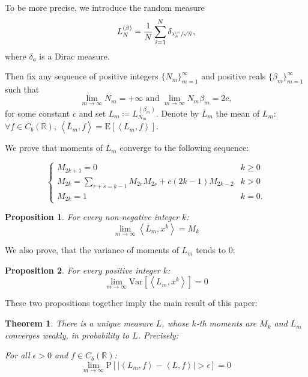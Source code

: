 \documentclass{article}
\newtheorem{theorem}{Theorem}
\newtheorem{proposition}{Proposition}
\newcommand{\apply}[2]{\left\langle#1, #2\right\rangle}
\newcommand{\prob}[1]{\mathrm{P}{\left[#1\right]}}
\newcommand{\Var}{\mathrm{Var}}
\newcommand{\E}{\mathrm{E}}
\begin{document}
    To be more precise, we introduce the random measure
    $$
        L_{N}^{(\beta)} = \frac{1}{N}\sum\limits_{i = 1}^{N}\delta_{\sfrac{\lambda_{N}^{(\beta)}}{\sqrt{N}}},
    $$
    where $\delta_{a}$ is a Dirac measure.

    
    Then fix any sequence of positive integers $\{N_m\}_{m = 1}^{\infty}$ and positive reals $\{\beta_{m}\}_{m = 1}^{\infty}$ such that
    $$
        \lim\limits_{m \to \infty}N_m = +\infty \text{ and } \lim\limits_{m \to \infty}N_m\beta_m = 2c,
    $$
    for some constant $c$ and set $L_m \coloneqq L_{N_m}^{(\beta_m)}$. Denote by $\overline{L}_m$ the mean of $L_m$: $\forall f \in C_{b}(\mathbb{R}), \, \apply{\overline{L}_m}{f} = \E\left[\apply{L_m}{f}\right]$.
    
    We prove that moments of $\overline{L}_m$ converge to the following sequence:

$$
    \begin{cases}
        M_{2k + 1} = 0 & k \geq 0 \\
		M_{2k} = \sum\limits_{r + s = k - 1}M_{2r}M_{2s} + c(2k - 1)M_{2k - 2} & k > 0 \\
		M_{2k} = 1 & k = 0.
	\end{cases}
$$

    \begin{proposition}\label{prop:moments}
    For every non-negative integer $k$:
    $$
    \lim\limits_{m \to \infty}\apply{\overline{L}_m}{x^k} = M_{k}
    $$
    \end{proposition}

    We also prove, that the variance of moments of $L_m$ tends to $0$:
    
    \begin{proposition}\label{prop:variance}
    For every positive integer $k$:
    $$
    \lim\limits_{m \to \infty}\Var\left[\apply{L_m}{x^k}\right] = 0
    $$
    \end{proposition}

    These two propositions together imply the main result of this paper:
    
    \begin{theorem}\label{theorem:main}
        There is a unique measure $L$, whose $k$-th moments are $M_k$ and $L_m$ converges weakly, in probability to $L$. Precisely:
        
        For all $\epsilon > 0$ and $f \in C_b(\mathbb{R})$:
        $$
            \lim\limits_{m \to \infty}\prob{\left|\apply{L_m}{f} - \apply{L}{f}\right| > \epsilon} = 0
        $$
    \end{theorem}
\end{document}
